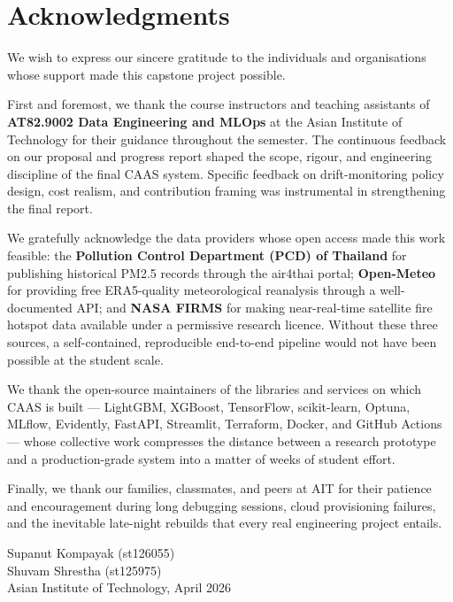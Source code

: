 \chapter*{Acknowledgments}

We wish to express our sincere gratitude to the individuals and organisations
whose support made this capstone project possible.

First and foremost, we thank the course instructors and teaching assistants of
\textbf{AT82.9002 Data Engineering and MLOps} at the Asian Institute of
Technology for their guidance throughout the semester. The continuous feedback
on our proposal and progress report shaped the scope, rigour, and engineering
discipline of the final CAAS system. Specific feedback on drift-monitoring
policy design, cost realism, and contribution framing was instrumental in
strengthening the final report.

We gratefully acknowledge the data providers whose open access made this work
feasible: the \textbf{Pollution Control Department (PCD) of Thailand} for
publishing historical PM2.5 records through the air4thai portal;
\textbf{Open-Meteo} for providing free ERA5-quality meteorological reanalysis
through a well-documented API; and \textbf{NASA FIRMS} for making
near-real-time satellite fire hotspot data available under a permissive
research licence. Without these three sources, a self-contained, reproducible
end-to-end pipeline would not have been possible at the student scale.

We thank the open-source maintainers of the libraries and services on which
CAAS is built --- LightGBM, XGBoost, TensorFlow, scikit-learn, Optuna, MLflow,
Evidently, FastAPI, Streamlit, Terraform, Docker, and GitHub Actions ---
whose collective work compresses the distance between a research prototype
and a production-grade system into a matter of weeks of student effort.

Finally, we thank our families, classmates, and peers at AIT for their
patience and encouragement during long debugging sessions, cloud
provisioning failures, and the inevitable late-night rebuilds that
every real engineering project entails.

\vspace{0.5cm}

\noindent Supanut Kompayak (st126055) \\
\noindent Shuvam Shrestha (st125975) \\
\noindent Asian Institute of Technology, April 2026
